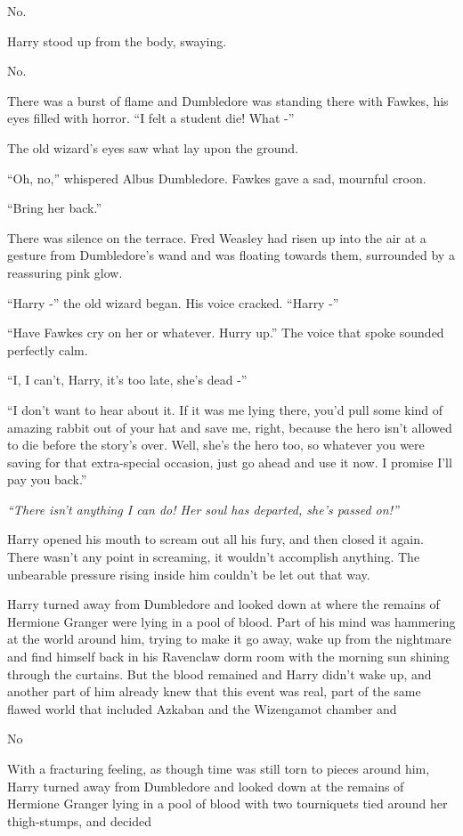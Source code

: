 No.

Harry stood up from the body, swaying.

No.

There was a burst of flame and Dumbledore was standing there with
Fawkes, his eyes filled with horror. ``I felt a student die! What -''

The old wizard's eyes saw what lay upon the ground.

``Oh, no,'' whispered Albus Dumbledore. Fawkes gave a sad, mournful
croon.

``Bring her back.''

There was silence on the terrace. Fred Weasley had risen up into the air
at a gesture from Dumbledore's wand and was floating towards them,
surrounded by a reassuring pink glow.

``Harry -'' the old wizard began. His voice cracked. ``Harry -''

``Have Fawkes cry on her or whatever. Hurry up.'' The voice that spoke
sounded perfectly calm.

``I, I can't, Harry, it's too late, she's dead -''

``I don't want to hear about it. If it was me lying there, you'd pull
some kind of amazing rabbit out of your hat and save me, right, because
the hero isn't allowed to die before the story's over. Well, she's the
hero too, so whatever you were saving for that extra-special occasion,
just go ahead and use it now. I promise I'll pay you back.''

\emph{``There isn't anything I can do! Her soul has departed, she's
passed on!''}

Harry opened his mouth to scream out all his fury, and then closed it
again. There wasn't any point in screaming, it wouldn't accomplish
anything. The unbearable pressure rising inside him couldn't be let out
that way.

Harry turned away from Dumbledore and looked down at where the remains
of Hermione Granger were lying in a pool of blood. Part of his mind was
hammering at the world around him, trying to make it go away, wake up
from the nightmare and find himself back in his Ravenclaw dorm room with
the morning sun shining through the curtains. But the blood remained and
Harry didn't wake up, and another part of him already knew that this
event was real, part of the same flawed world that included Azkaban and
the Wizengamot chamber and

No

With a fracturing feeling, as though time was still torn to pieces
around him, Harry turned away from Dumbledore and looked down at the
remains of Hermione Granger lying in a pool of blood with two
tourniquets tied around her thigh-stumps, and decided

